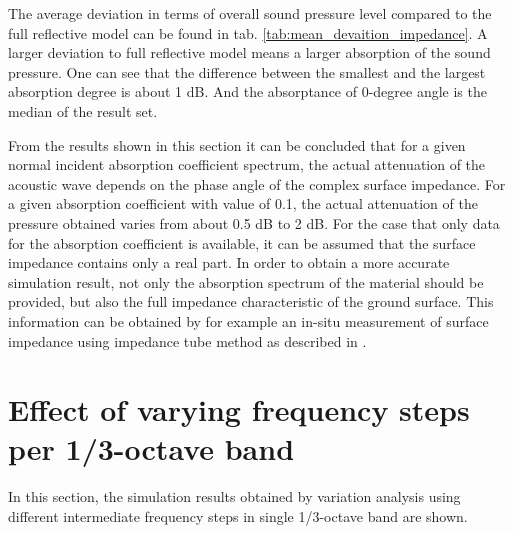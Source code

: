The average deviation in terms of overall sound pressure level compared to the full reflective model can be found in tab. \ref{tab:mean_devaition_impedance}. A larger deviation to full reflective model means a larger absorption of the sound pressure. One can see that the difference between the smallest and the largest absorption degree is about 1 dB. And the absorptance of 0-degree angle is the median of the result set.

From the results shown in this section it can be concluded that for a given normal incident absorption coefficient spectrum, the actual attenuation of the acoustic wave depends on the phase angle of the complex surface impedance. For a given absorption coefficient with value of 0.1, the actual attenuation of the pressure obtained varies from about 0.5 dB to 2 dB. For the case that only data for the absorption coefficient is available, it can be assumed that the surface impedance contains only a real part. In order to obtain a more accurate simulation result, not only the absorption spectrum of the material should be provided, but also the full impedance characteristic of the ground surface. This information can be obtained by for example an in-situ measurement of surface impedance using impedance tube method as described in \cite{hald_situ_2019, wolkesson_2013}.

\section{Effect of varying frequency steps per 1/3-octave band}

In this section, the simulation results obtained by variation analysis using different intermediate frequency steps in single 1/3-octave band are shown.

